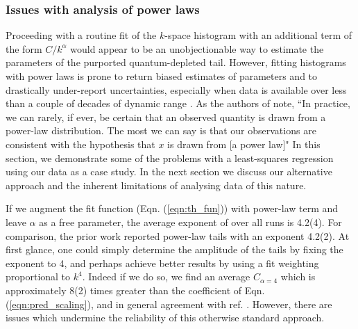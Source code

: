 \subsubsection{Issues with analysis of power laws}	
\label{sec:pow_issues}

	Proceeding with a routine fit of the $k$-space histogram with an additional term of the form $C/k^\alpha$ would appear to be an unobjectionable way to estimate the parameters of the purported quantum-depleted tail.
	However, fitting histograms with power laws is prone to return biased estimates of parameters and to drastically under-report uncertainties, especially when data is available over less than a couple of decades of dynamic range \cite{Clauset09,Virkar14}. 
	As the authors of \cite{Clauset09} note, ``In practice, we can rarely, if ever, be certain that an observed quantity is drawn from a power-law distribution. The most we can say is that our observations are consistent with the hypothesis that $x$ is drawn from [a power law]"
	In this section, we demonstrate some of the problems with a least-squares regression using our data as a case study.
	In the next section we discuss our alternative approach and the inherent limitations of analysing data of this nature.
	
	If we augment the fit function (Eqn. (\ref{eqn:th_fun})) with power-law term and leave $\alpha$ as a free parameter, the average exponent of over all runs is 4.2(4). 
	For comparison, the prior work \cite{Chang16} reported power-law tails with an exponent 4.2(2).
	At first glance, one could simply determine the amplitude of the tails by fixing the exponent to 4, and perhaps achieve better results by using a fit weighting proportional to $k^4$.  
	Indeed if we do so, we find an average $C_{\alpha=4}$ which is approximately 8(2) times greater than the coefficient of Eqn. (\ref{eqn:pred_scaling}), and in general agreement with ref. \cite{Chang16}.
	However, there are issues which undermine the reliability of this otherwise standard approach.

